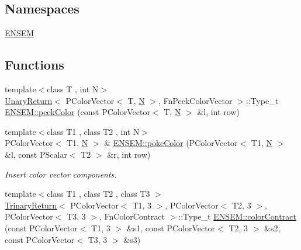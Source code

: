 \subsection*{Namespaces}
\begin{DoxyCompactItemize}
\item 
 \mbox{\hyperlink{namespaceENSEM}{E\+N\+S\+EM}}
\end{DoxyCompactItemize}
\subsection*{Functions}
\begin{DoxyCompactItemize}
\item 
{\footnotesize template$<$class T , int N$>$ }\\\mbox{\hyperlink{structUnaryReturn}{Unary\+Return}}$<$ P\+Color\+Vector$<$ T, \mbox{\hyperlink{adat__devel_2lib_2hadron_2operator__name__util_8cc_a7722c8ecbb62d99aee7ce68b1752f337}{N}} $>$, Fn\+Peek\+Color\+Vector $>$\+::Type\+\_\+t \mbox{\hyperlink{namespaceENSEM_a795563dd1752d6dee39fee8212b66d34}{E\+N\+S\+E\+M\+::peek\+Color}} (const P\+Color\+Vector$<$ T, \mbox{\hyperlink{adat__devel_2lib_2hadron_2operator__name__util_8cc_a7722c8ecbb62d99aee7ce68b1752f337}{N}} $>$ \&l, int row)
\item 
{\footnotesize template$<$class T1 , class T2 , int N$>$ }\\P\+Color\+Vector$<$ T1, \mbox{\hyperlink{adat__devel_2lib_2hadron_2operator__name__util_8cc_a7722c8ecbb62d99aee7ce68b1752f337}{N}} $>$ \& \mbox{\hyperlink{namespaceENSEM_a2f18aee00e855aafa93d3931e3fa1d1a}{E\+N\+S\+E\+M\+::poke\+Color}} (P\+Color\+Vector$<$ T1, \mbox{\hyperlink{adat__devel_2lib_2hadron_2operator__name__util_8cc_a7722c8ecbb62d99aee7ce68b1752f337}{N}} $>$ \&l, const P\+Scalar$<$ T2 $>$ \&r, int row)
\begin{DoxyCompactList}\small\item\em Insert color vector components. \end{DoxyCompactList}\item 
{\footnotesize template$<$class T1 , class T2 , class T3 $>$ }\\\mbox{\hyperlink{structTrinaryReturn}{Trinary\+Return}}$<$ P\+Color\+Vector$<$ T1, 3 $>$, P\+Color\+Vector$<$ T2, 3 $>$, P\+Color\+Vector$<$ T3, 3 $>$, Fn\+Color\+Contract $>$\+::Type\+\_\+t \mbox{\hyperlink{namespaceENSEM_a7858a8fd90447e56b22d0e84f6059d3f}{E\+N\+S\+E\+M\+::color\+Contract}} (const P\+Color\+Vector$<$ T1, 3 $>$ \&s1, const P\+Color\+Vector$<$ T2, 3 $>$ \&s2, const P\+Color\+Vector$<$ T3, 3 $>$ \&s3)

\end{DoxyCompactItemize}
